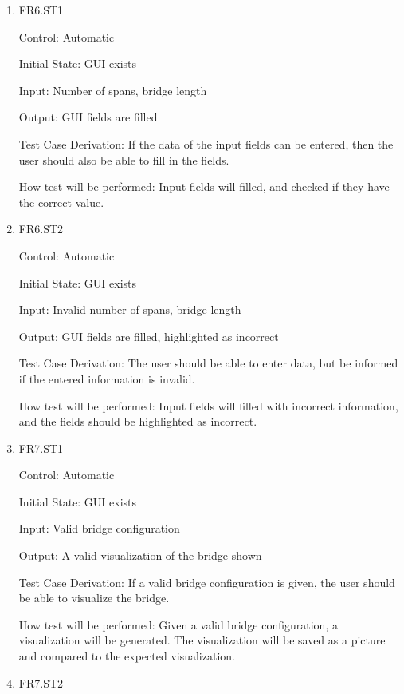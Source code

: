 \documentclass[12pt, titlepage]{article}
\begin{document}
\begin{enumerate}

  \item{FR6.ST1\\}

  Control: Automatic
  
  Initial State: GUI exists
  
  Input: Number of spans, bridge length
  
  Output: GUI fields are filled
  
  Test Case Derivation: If the data of the input fields can be entered, then the user
  should also be able to fill in the fields.
  
  How test will be performed: Input fields will filled, and checked if they have the
  correct value.
  
  \item{FR6.ST2\\}
  
  Control: Automatic
  
  Initial State: GUI exists
  
  Input: Invalid number of spans, bridge length
  
  Output: GUI fields are filled, highlighted as incorrect
  
  Test Case Derivation: The user should be able to enter data, but be informed if the
  entered information is invalid.
  
  How test will be performed: Input fields will filled with incorrect information, 
  and the fields should be highlighted as incorrect.
  
  \item{FR7.ST1\\}
  
  Control: Automatic
  
  Initial State: GUI exists
  
  Input: Valid bridge configuration
  
  Output: A valid visualization of the bridge shown
  
  Test Case Derivation: If a valid bridge configuration is given, the user should be able to
  visualize the bridge.
  
  How test will be performed: Given a valid bridge configuration, a visualization will be generated.
  The visualization will be saved as a picture and compared to the expected visualization.
  
  \item{FR7.ST2\\}
  

\end{enumerate}
\end{document}
